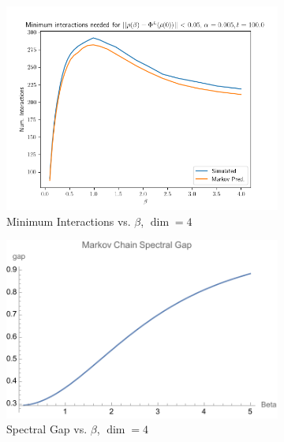 \documentclass{article}
\begin{document}
\begin{figure}
    \centering
    \begin{subfigure}{0.55\textwidth}
    \includegraphics[width=\textwidth]{numerics/data/sho_l_vs_beta.png}
    \caption{Minimum Interactions vs. $\beta$, $\dim = 4$}
    \label{fig:sho_l_vs_beta_dim_4}
    \end{subfigure}
    \hfill
    \begin{subfigure}{0.55\textwidth}
    \includegraphics[width=\textwidth]{numerics/data/spec_gap_dim_4.pdf}
    \caption{Spectral Gap vs. $\beta$, $\dim = 4$}
    \label{fig:sho_spectral_gap_vs_beta}
    \end{subfigure}
    \hfill
    \begin{subfigure}{0.55\textwidth}

\end{subfigure}
\end{figure}
\end{document}
